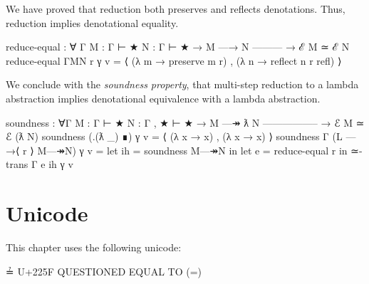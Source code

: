 We have proved that reduction both preserves and reflects denotations.
Thus, reduction implies denotational equality.

\begin{fence}
\begin{code}
reduce-equal : ∀ {Γ} {M : Γ ⊢ ★} {N : Γ ⊢ ★}
  → M —→ N
    ---------
  → ℰ M ≃ ℰ N
reduce-equal {Γ}{M}{N} r γ v =
    ⟨ (λ m → preserve m r) , (λ n → reflect n r refl) ⟩
\end{code}
\end{fence}

We conclude with the \emph{soundness property}, that multi-step
reduction to a lambda abstraction implies denotational equivalence with
a lambda abstraction.

\begin{fence}
\begin{code}
soundness : ∀{Γ} {M : Γ ⊢ ★} {N : Γ , ★ ⊢ ★}
  → M —↠ ƛ N
    -----------------
  → ℰ M ≃ ℰ (ƛ N)
soundness (.(ƛ _) ∎) γ v = ⟨ (λ x → x) , (λ x → x) ⟩
soundness {Γ} (L —→⟨ r ⟩ M—↠N) γ v =
   let ih = soundness M—↠N in
   let e = reduce-equal r in
   ≃-trans {Γ} e ih γ v
\end{code}
\end{fence}

\hypertarget{unicode}{%
\section{Unicode}\label{unicode}}

This chapter uses the following unicode:

\begin{myDisplay}
≟  U+225F  QUESTIONED EQUAL TO (\?=)
\end{myDisplay}

